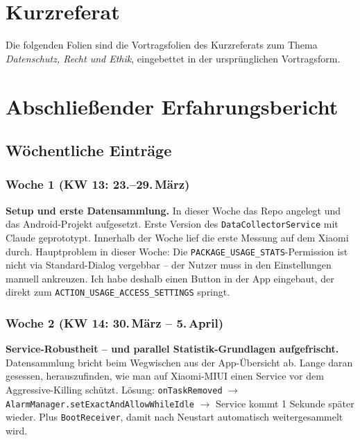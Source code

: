\documentclass[12pt, a4paper, ngerman]{article}
\newcommand{\code}[1]{\texttt{#1}}
\begin{document}
\newpage

\section{Kurzreferat}

Die folgenden Folien sind die Vortragsfolien des Kurzreferats zum
Thema \emph{Datenschutz, Recht und Ethik}, eingebettet in der ursprünglichen
Vortragsform.



\section{Abschließender Erfahrungsbericht}
\label{sec:wochenbericht}

\subsection{Wöchentliche Einträge}

\subsubsection*{Woche 1 (KW 13: 23.--29.\,März)}

\textbf{Setup und erste Datensammlung.}
In dieser Woche das Repo angelegt und das Android-Projekt
aufgesetzt. Erste Version
des \code{DataCollectorService} mit Claude geprototypt.
Innerhalb der Woche lief die erste Messung auf dem
Xiaomi durch. Hauptproblem in dieser Woche: Die
\code{PACKAGE\_USAGE\_STATS}-Permission ist nicht via
Standard-Dialog vergebbar -- der Nutzer muss in den Einstellungen
manuell ankreuzen. Ich habe deshalb einen Button in der App
eingebaut, der direkt zum \code{ACTION\_USAGE\_ACCESS\_SETTINGS}
springt.

\subsubsection*{Woche 2 (KW 14: 30.\,März -- 5.\,April)}

\textbf{Service-Robustheit -- und parallel Statistik-Grundlagen
aufgefrischt.}
Datensammlung bricht beim Wegwischen aus der App-Übersicht ab.
Lange daran gesessen, herauszufinden, wie man auf Xiaomi-MIUI
einen Service vor dem Aggressive-Killing schützt.
Lösung: \code{onTaskRemoved} $\to$
\code{AlarmManager.\allowbreak setExact\allowbreak AndAllowWhileIdle} $\to$ Service kommt
1 Sekunde später wieder. Plus \code{BootReceiver}, damit nach
Neustart automatisch weitergesammelt wird.
\end{document}
